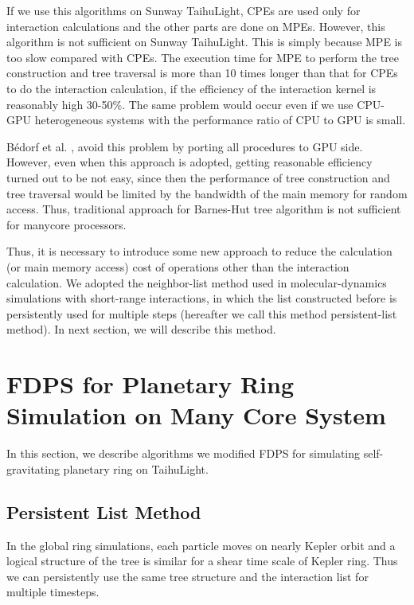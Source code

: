 \documentclass[oribibl]{llncs}
\begin{document}
If we use this algorithms on Sunway TaihuLight, CPEs are used only for
interaction calculations and the other parts are done on
MPEs. However, this algorithm is not sufficient on Sunway
TaihuLight. This is simply because MPE is too slow compared with
CPEs. The execution time for MPE to perform the tree construction and
tree traversal is more than 10 times longer than that for CPEs to do
the interaction calculation, if the efficiency of the interaction
kernel is reasonably high 30-50\%. The same problem would occur even
if we use CPU-GPU heterogeneous systems with the performance ratio of
CPU to GPU is small.

B{\'e}dorf et al. \cite{2014hpcn.conf...54B}, avoid this problem by
porting all procedures to GPU side. However, even when this approach
is adopted, getting reasonable efficiency turned out to be not easy,
since then the performance of tree construction and tree traversal
would be limited by the bandwidth of the main memory for random
access.  Thus, traditional approach for Barnes-Hut tree algorithm is
not sufficient for manycore processors.

Thus, it is necessary to introduce some new approach to reduce the
calculation (or main memory access) cost of operations other than the
interaction calculation. We adopted the neighbor-list method used in
molecular-dynamics simulations with short-range interactions, in which
the list constructed before is persistently used for multiple steps
(hereafter we call this method persistent-list method). In next
section, we will describe this method.

\section{FDPS for Planetary Ring Simulation on Many Core System}
\label{sec:impl1}

In this section, we describe algorithms we modified FDPS for
simulating self-gravitating planetary ring on TaihuLight.

\subsection{Persistent List Method}
\label{subsec:list}

In the global ring simulations, each particle moves on nearly Kepler
orbit and a logical structure of the tree is similar for a shear time
scale of Kepler ring. Thus we can persistently use the same tree
structure and the interaction list for multiple timesteps.
\end{document}
